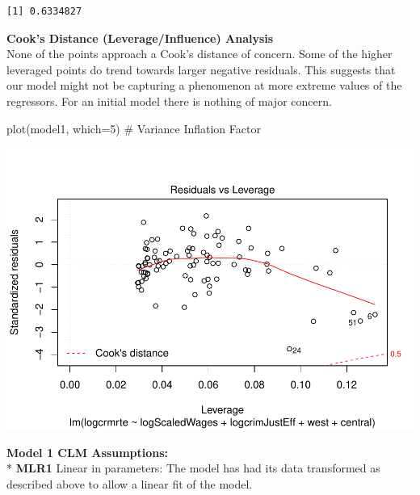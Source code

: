 \documentclass[]{article}
\newenvironment{Shaded}{}{}
\newcommand{\CommentTok}[1]{\textcolor[rgb]{0.00,0.50,0.00}{#1}}
\newcommand{\DataTypeTok}[1]{#1}
\newcommand{\DecValTok}[1]{#1}
\newcommand{\KeywordTok}[1]{\textcolor[rgb]{0.00,0.00,1.00}{#1}}
\newcommand{\NormalTok}[1]{#1}
\newcommand{\OperatorTok}[1]{#1}
\begin{document}
\begin{Shaded}
\end{Shaded}

\begin{verbatim}
[1] 0.6334827
\end{verbatim}

\textbf{Cook's Distance (Leverage/Influence) Analysis}\\
None of the points approach a Cook's distance of concern. Some of the
higher leveraged points do trend towards larger negative residuals. This
suggests that our model might not be capturing a phenomenon at more
extreme values of the regressors. For an initial model there is nothing
of major concern.

\begin{Shaded}
\begin{Highlighting}[]
\KeywordTok{plot}\NormalTok{(model1, }\DataTypeTok{which=}\DecValTok{5}\NormalTok{) }\CommentTok{# Variance Inflation Factor}
\end{Highlighting}
\end{Shaded}

\includegraphics{Bagnard_Gaustad_Hartman_Leung_Lab_3_files/figure-latex/unnamed-chunk-59-1.pdf}

\textbf{Model 1 CLM Assumptions:}\\
* \textbf{MLR1} Linear in parameters: The model has had its data
transformed as described above to allow a linear fit of the model.
\end{document}
